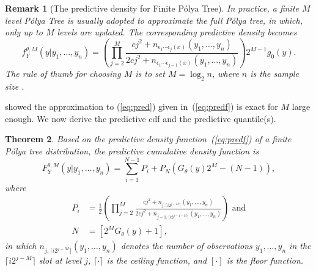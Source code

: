 \documentclass[12pt]{article}
\newtheorem{thm}{Theorem}[section]
\newtheorem{rmk}[thm]{Remark}
\newcommand{\polya}{P\'{o}lya}
\begin{document}
\begin{rmk}[The predictive density for Finite \polya{} Tree]
  In practice, a finite $M$ level \polya{} Tree is usually adopted to
  approximate the full \polya{} tree, in which, only up to $M$ levels
  are updated. The corresponding predictive density becomes
  \begin{equation}
    \label{eq:predf}
    f_Y^{\theta, M} (y|y_1, \ldots, y_n)  =  \left(
      \prod_{j=2}^M \frac{cj^2 + n_{\epsilon_1 \cdots \epsilon_j(x) }(y_1, \ldots, y_n)}{2cj^2
        + n_{\epsilon_1 \cdots \epsilon_{j-1}(x)}(y_1, \ldots, y_n)}
    \right)2^{M-1} g_0(y).
  \end{equation}
  The rule of thumb for choosing $M$ is to set $M=\log_2n$, where $n$
  is the sample size \citep{hanson2002}.
\end{rmk}

\citet{hanson2002} showed the approximation to (\ref{eq:pred}) given
in~(\ref{eq:predf}) is exact for $M$ large enough.  We now derive the
predictive cdf and the predictive quantile(s).

\begin{thm}
  Based on the predictive density function~(\ref{eq:predf}) of a
  finite \polya{} tree distribution, the predictive cumulative density
  function is
  \begin{equation}
    \label{eq:cdf}
    F^{\theta,M}_Y(y|y_1, \ldots, y_n) = \sum_{i=1}^{N-1} P_{i} + P_N
    \left( G_{\theta}(y)2^M -(N-1) \right),
  \end{equation}
  where
  \begin{align*}
    P_i &= \frac{1}{2} \left(\prod_{j=2}^M \frac{cj^2 + n_{j,\lceil
          i2^{j-M} \rceil}(y_1, \ldots, y_n)}{2cj^2 + n_{j-1,\lceil
          i2^{j-1-M} \rceil}(y_{1 },\ldots, y_n)} \right) \mbox{ and}\\
    N & = \left[ 2^{M } G_{\theta}(y) +1\right],
  \end{align*}
  in which $n_{j,\lceil i2^{j-M} \rceil}(y_1, \ldots, y_n)$ denotes
  the number of observations $y_1, \ldots, y_n$ in the $\lceil
  i2^{j-M} \rceil$ slot at level $j$, $\lceil \cdot \rceil$ is the
  ceiling function, and $[ \cdot ]$ is the floor function.
\end{thm}
\end{document}
